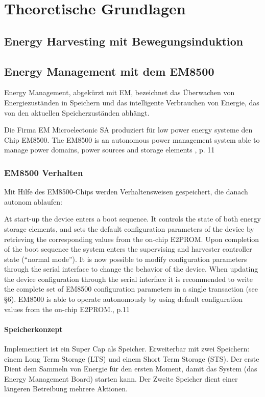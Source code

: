 \chapter{Theoretische Grundlagen}

\section{Energy Harvesting mit Bewegungsinduktion}

\section{Energy Management mit dem EM8500}
Energy Management, abgekürzt mit EM, bezeichnet das Überwachen von Energiezuständen in Speichern und das intelligente Verbrauchen von Energie, das von den aktuellen Speicherzuständen abhängt.

Die Firma EM Microelectonic SA produziert für low power energy systeme den Chip EM8500.
The EM8500 is an autonomous power management system able to manage power domains, power sources and storage elements \cite{datasheet_EM85}, p. 11

\subsection{EM8500 Verhalten}

Mit Hilfe des EM8500-Chips werden Verhaltensweisen gespeichert, die danach autonom ablaufen:

At start-up the device enters a boot sequence. It controls the state of both energy storage elements, and sets the default configuration parameters
of the device by retrieving the corresponding values from the on-chip E2PROM.
Upon completion of the boot sequence the system enters the supervising and harvester controller state (“normal mode”). It is now possible to
modify configuration parameters through the serial interface to change the behavior of the device. When updating the device configuration through
the serial interface it is recommended to write the complete set of EM8500 configuration parameters in a single transaction (see §6).
EM8500 is able to operate autonomously by using default configuration values from the on-chip E2PROM.\cite{datasheet_EM85}, p.11

\subsubsection{Speicherkonzept}
Implementiert ist ein Super Cap als Speicher. Erweiterbar mit zwei Speichern: einem Long Term Storage (LTS) und einem Short Term Storage (STS). Der erste Dient dem Sammeln von Energie für den ersten Moment, damit das System (das Energy Management Board) starten kann. Der Zweite Speicher dient einer längeren Betreibung mehrere Aktionen.



